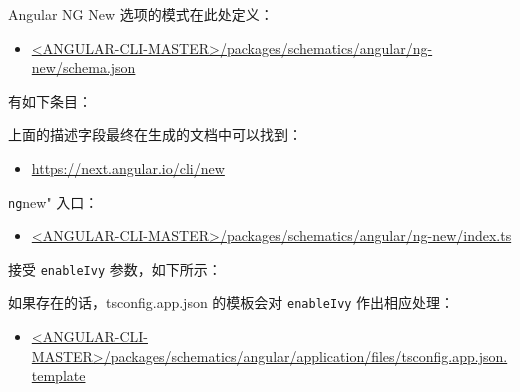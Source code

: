 


Angular NG New 选项的模式在此处定义：

\begin{itemize}
  \item \href{https://github.com/angular/angular-cli/blob/master/packages/schematics/angular/ng-new/schema.json}
        {<ANGULAR-CLI-MASTER>/packages/schematics/angular/ng-new/schema.json}
\end{itemize}


有如下条目：




上面的描述字段最终在生成的文档中可以找到：

\begin{itemize}
  \item \url{https://next.angular.io/cli/new}
\end{itemize}


\texttt{ng}new" 入口：

\begin{itemize}
  \item \href{https://github.com/angular/angular-cli/blob/master/packages/schematics/angular/ng-new/index.ts}
        {<ANGULAR-CLI-MASTER>/packages/schematics/angular/ng-new/index.ts}
\end{itemize}


接受 \texttt{enableIvy} 参数，如下所示：




如果存在的话，tsconfig.app.json 的模板会对 \texttt{enableIvy} 作出相应处理：

\begin{itemize}
  \item \href{https://github.com/angular/angular-cli/blob/master/packages/schematics/angular/application/files/tsconfig.app.json.template}
        {<ANGULAR-CLI-MASTER>/packages/schematics/angular/application/files/tsconfig.app.json.template}
\end{itemize}

